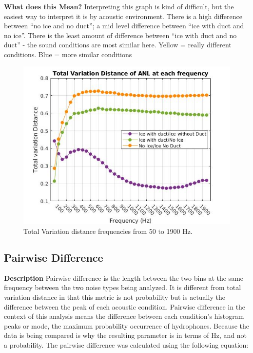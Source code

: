 \textbf{What does this Mean?}
Interpreting this graph is kind of difficult, but the easiest way to interpret it is by acoustic environment. There is a high difference between “no ice and no duct”; a mid level difference between “ice with duct and no ice”. There is the least amount of difference between “ice with duct and no duct” - the sound conditions are most similar here.
Yellow = really different conditions. Blue = more similar conditions

\begin{figure}[h]
\centering
\includegraphics[scale=0.5]{Figures/recolor_total_var_dist_norm_pdf.jpg}
\caption{Total Variation distance frequencies from 50 to 1900 Hz.}
\label{fig_totvardist}
\end{figure}

\subsection{Pairwise Difference}
\textbf{Description}
Pairwise difference is the length between the two bins at the same frequency between the two noise types being analyzed. It is different from total variation distance in that this metric is not probability but is actually the difference between the peak of each acoustic condition. Pairwise difference in the context of this analysis means the difference between each condition's histogram peaks or mode, the maximum probability occurrence of hydrophones. Because the data is being compared  is why the resulting parameter is in terms of Hz, and not a probability.
The pairwise difference was calculated using the following equation:


